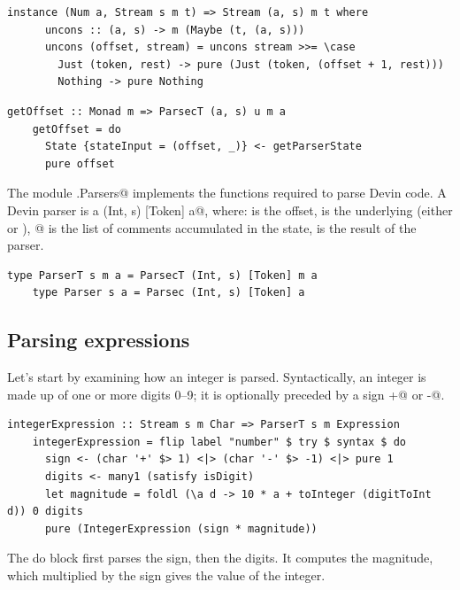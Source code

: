 \documentclass[UdineBachThesis,american,11pt,draft]{PhdThesis}
\begin{document}
  \begin{lstlisting}[gobble=4,basicstyle=\ttfamily\small]
    instance (Num a, Stream s m t) => Stream (a, s) m t where
      uncons :: (a, s) -> m (Maybe (t, (a, s)))
      uncons (offset, stream) = uncons stream >>= \case
        Just (token, rest) -> pure (Just (token, (offset + 1, rest)))
        Nothing -> pure Nothing
  \end{lstlisting}

  \begin{lstlisting}[gobble=4,basicstyle=\ttfamily\small]
    getOffset :: Monad m => ParsecT (a, s) u m a
    getOffset = do
      State {stateInput = (offset, _)} <- getParserState
      pure offset
  \end{lstlisting}

  The module \lstinline@Devin.Parsers@ implements the functions required to
  parse Devin code. A Devin parser is a \lstinline@Parsec (Int, s) [Token] a@,
  where: \lstinline@Int@ is the offset, \lstinline@s@ is the underlying
  \lstinline@Steam@ (either \lstinline@String@ or \lstinline@Text@),
  \lstinline@[Token]@ is the list of comments accumulated in the state,
  \lstinline@a@ is the result of the parser.

  \begin{lstlisting}[gobble=4,basicstyle=\ttfamily\small]
    type ParserT s m a = ParsecT (Int, s) [Token] m a
    type Parser s a = Parsec (Int, s) [Token] a
  \end{lstlisting}

  \subsection{Parsing expressions}

  Let's start by examining how an integer is parsed. Syntactically, an integer
  is made up of one or more digits 0--9; it is optionally preceded by a sign
  \lstinline@+@ or \lstinline@-@.

  \begin{lstlisting}[gobble=4,basicstyle=\ttfamily\small]
    integerExpression :: Stream s m Char => ParserT s m Expression
    integerExpression = flip label "number" $ try $ syntax $ do
      sign <- (char '+' $> 1) <|> (char '-' $> -1) <|> pure 1
      digits <- many1 (satisfy isDigit)
      let magnitude = foldl (\a d -> 10 * a + toInteger (digitToInt d)) 0 digits
      pure (IntegerExpression (sign * magnitude))
  \end{lstlisting}

  The do block first parses the sign, then the digits. It computes the
  magnitude, which multiplied by the sign gives the value of the integer.
\end{document}
